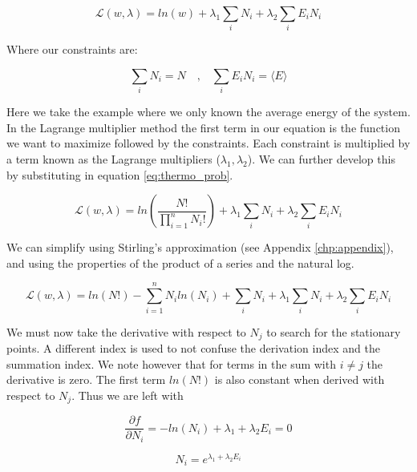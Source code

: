 \begin{equation}
    \mathcal{L}(w, \lambda) = ln(w) + \lambda_1 \sum_{i} N_i + \lambda_2 \sum_{i} E_i N_i
\end{equation}

Where our constraints are:

\begin{equation}
    \label{Aeq:constr}
    \sum_{i} N_i  = N \quad \text{,} \quad  \sum_{i} E_i N_i = \langle E \rangle
\end{equation}

Here we take the example where we only known the average energy of the system.
In the Lagrange multiplier method the first term in our equation is the function we want to maximize followed by the constraints. Each constraint is multiplied by a term known as the Lagrange multipliers ($\lambda_1 , \lambda_2$). We can further develop this by substituting in equation \ref{eq:thermo_prob}.

\begin{equation}
    \mathcal{L}(w, \lambda) = ln\left( \frac{N!}{\prod_{i=1}^{n} N_i!}  \right) + \lambda_1 \sum_{i} N_i + \lambda_2 \sum_{i} E_i N_i
\end{equation}

We can simplify using Stirling's approximation (see Appendix \ref{chp:appendix}), and using the properties of the product of a series and the natural log.


\begin{equation}
    \mathcal{L}(w, \lambda) =   ln\left( N! \right) - \sum_{i = 1}^{n} N_i ln \left( N_i \right )  + \sum_{i} N_i  + \lambda_1 \sum_{i} N_i + \lambda_2 \sum_{i} E_i N_i
\end{equation}


We must now take the derivative with respect to $N_j$ to search for the stationary points. A different index is used to not confuse the derivation index and the summation index. We note however that for terms in the sum with $i \neq j$ the derivative is zero. The first term $ln\left( N! \right)$ is also constant when derived with respect to $N_j$. Thus we are left with

\begin{equation}
    \frac{\partial f}{\partial N_i} = - ln(N_i) + \lambda_1 + \lambda_2 E_i = 0
\end{equation}

\begin{equation}
    \label{Aeq:N_i}
    N_i = e^{\lambda_1 + \lambda_2 E_i}
\end{equation}

